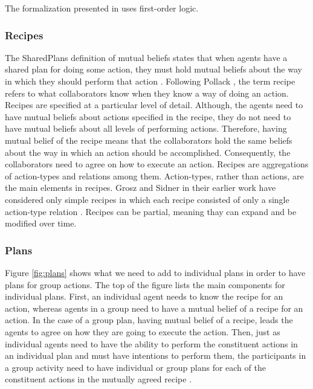 \documentclass[11pt]{article}
\begin{document}
The formalization presented in \cite{grosz:collaboration} uses first-order
logic.

\subsubsection{Recipes}
\label{sec:recipe}

The SharedPlans definition of mutual beliefs states that when agents have a
shared plan for doing some action, they must hold mutual beliefs about the way
in which they should perform that action
\cite{grosz:collaboration,grosz:plans-discourse}. Following Pollack
\cite{pollack:plan-mental-attitudes}, the term recipe refers to what
collaborators know when they know a way of doing an action. Recipes are
specified at a particular level of detail. Although, the agents need to have
mutual beliefs about actions specified in the recipe, they do not need to have
mutual beliefs about all levels of performing actions. Therefore, having mutual
belief of the recipe means that the collaborators hold the same beliefs about
the way in which an action should be accomplished. Consequently, the
collaborators need to agree on how to execute an action. Recipes are
aggregations of action-types and relations among them. Action-types, rather than
actions, are the main elements in recipes. Grosz and Sidner in their earlier
work \cite{grosz:plans-discourse} have considered only simple recipes in which
each recipe consisted of only a single action-type relation
\cite{lochbaum:plan-models}. Recipes can be partial, meaning thay can expand and
be modified over time.

\subsubsection{Plans}

Figure \ref{fig:plans} shows what we need to add to individual plans in order to
have plans for group actions. The top of the figure lists the main components
for individual plans. First, an individual agent needs to know the recipe for an
action, whereas agents in a group need to have a mutual belief of a recipe for
an action. In the case of a group plan, having mutual belief of a recipe, leads
the agents to agree on how they are going to execute the action. Then, just as
individual agents need to have the ability to perform the constituent actions in
an individual plan and must have intentions to perform them, the participants in
a group activity need to have individual or group plans for each of the
constituent actions in the mutually agreed recipe
\cite{grosz:collaborative-systems, grosz:plans-discourse}.
\end{document}
